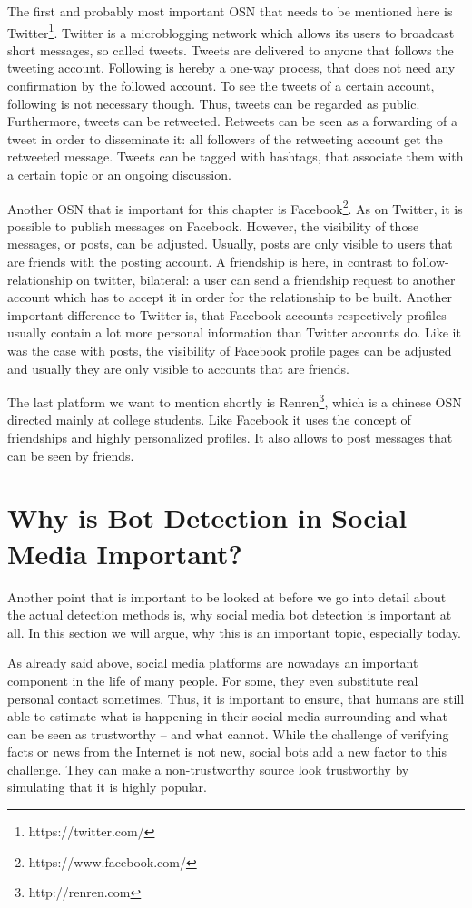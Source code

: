 The first and probably most important OSN that needs to be mentioned here is Twitter\footnote{https://twitter.com/}. Twitter is a microblogging network which allows its users to broadcast short messages, so called tweets. Tweets are delivered to anyone that follows the tweeting account. Following is hereby a one-way process, that does not need any confirmation by the followed account. To see the tweets of a certain account, following is not necessary though. Thus, tweets can be regarded as public. Furthermore, tweets can be retweeted. Retweets can be seen as a forwarding of a tweet in order to disseminate it: all followers of the retweeting account get the retweeted message.  Tweets can be tagged with hashtags, that associate them with a certain topic or an ongoing discussion.

Another OSN that is important for this chapter is Facebook\footnote{https://www.facebook.com/}. As on Twitter, it is possible to publish messages on Facebook. However, the visibility of those messages, or posts, can be adjusted. Usually, posts are only visible to users that are friends with the posting account. A friendship is here, in contrast to follow-relationship on twitter, bilateral: a user can send a friendship request to another account which has to accept it in order for the relationship to be built. Another important difference to Twitter is, that Facebook accounts respectively profiles usually contain a lot more personal information than Twitter accounts do. Like it was the case with posts, the visibility of Facebook profile pages can be adjusted and usually they are only visible to accounts that are friends.

The last platform we want to mention shortly is Renren\footnote{http://renren.com}, which is a chinese OSN directed mainly at college students. Like Facebook it uses the concept of friendships and highly personalized profiles. It also allows to post messages that can be seen by friends.

\section{Why is Bot Detection in Social Media Important?}
Another point that is important to be looked at before we go into detail about the actual detection methods is, why social media bot detection is important at all. In this section we will argue, why this is an important topic, especially today. 

As already said above, social media platforms are nowadays an important component in the life of many people. For some, they even substitute real personal contact sometimes. Thus, it is important to ensure, that humans are still able to estimate what is happening in their social media surrounding and what can be seen as trustworthy -- and what cannot. While the challenge of verifying facts or news from the Internet is not new, social bots add a new factor to this challenge. They can make a non-trustworthy source look trustworthy by simulating that it is highly popular.


